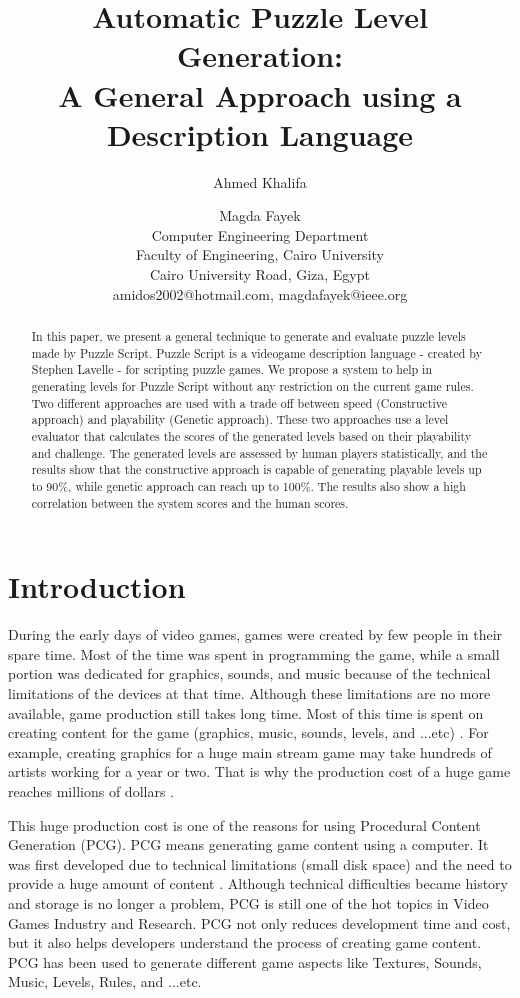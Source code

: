 \documentclass[letterpaper]{article}
\title{Automatic Puzzle Level Generation:\\
A General Approach using a Description Language}
\author{Ahmed Khalifa \and Magda Fayek\\
Computer Engineering Department\\
Faculty of Engineering, Cairo University\\
Cairo University Road, Giza, Egypt\\
amidos2002@hotmail.com, magdafayek@ieee.org\\
}
\begin{document}
 
\maketitle
\begin{abstract}
In this paper, we present a general technique to generate and evaluate puzzle levels made by Puzzle Script. Puzzle Script is a videogame description language - created by Stephen Lavelle - for scripting puzzle games. We propose a system to help in generating levels for Puzzle Script without any restriction on the current game rules. Two different approaches are used with a trade off between speed (Constructive approach) and playability (Genetic approach). These two approaches use a level evaluator that calculates the scores of the generated levels based on their playability and challenge. The generated levels are assessed by human players statistically, and the results show that the constructive approach is capable of generating playable levels up to 90\%, while genetic approach can reach up to 100\%. The results also show a high correlation between the system scores and the human scores.
\end{abstract}

\section{Introduction}
During the early days of video games, games were created by few people in their spare time. Most of the time was spent in programming the game, while a small portion was dedicated for graphics, sounds, and music because of the technical limitations of the devices at that time. Although these limitations are no more available, game production still takes long time. Most of this time is spent on creating content for the game (graphics, music, sounds, levels, and ...etc) \citeauthor{budgetAAA}. For example, creating graphics for a huge main stream game may take hundreds of artists working for a year or two. That is why the production cost of a huge game reaches millions of dollars \citeauthor{gameCost}.\\\par

This huge production cost is one of the reasons for using Procedural Content Generation (PCG). PCG means generating game content using a computer. It was first developed due to technical limitations (small disk space) and the need to provide a huge amount of content \citeauthor{pcgFirstGame}. Although technical difficulties became history and storage is no longer a problem, PCG is still one of the hot topics in Video Games Industry and Research. PCG not only reduces development time and cost, but it also helps developers understand the process of creating game content. PCG has been used to generate different game aspects like Textures, Sounds, Music, Levels, Rules, and ...etc.\\\par
\end{document}
